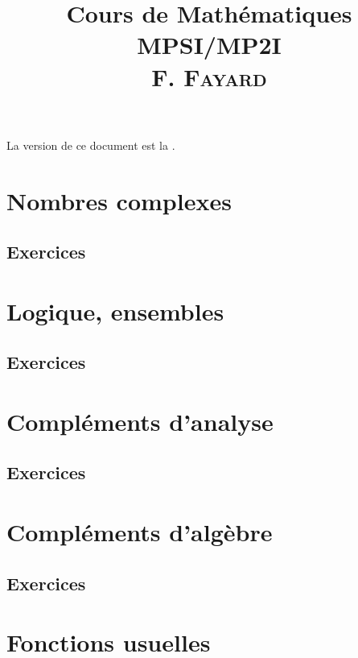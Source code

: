 \documentclass[book]{magnolia}
\title{{\Huge\bf Cours de Mathématiques}\\\vspace{1cm}
       \textbf{\Huge MPSI/MP2I}\\\vspace{1cm}
       \textsc{F. Fayard}\\\vspace{1cm}
       }
\begin{document}
\maketitle

La version de ce document est la \textsc{\GITAbrHash}.


\tableofcontents


\chapter{Nombres complexes}
\setcounter{numeroexercicecours}{1}

\section{Exercices}
\setcounter{numeroexercice}{1}


\chapter{Logique, ensembles}
\setcounter{numeroexercicecours}{1}

\section{Exercices}
\setcounter{numeroexercice}{1}


\chapter{Compléments d'analyse}
\setcounter{numeroexercicecours}{1}

\section{Exercices}
\setcounter{numeroexercice}{1}


\chapter{Compléments d'algèbre}
\setcounter{numeroexercicecours}{1}
\setcounter{numeroexercicecours}{1}

\section{Exercices}
\setcounter{numeroexercice}{1}


\chapter{Fonctions usuelles}
\setcounter{numeroexercicecours}{1}

\end{document}
